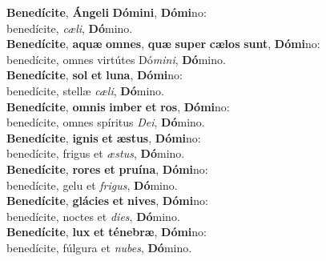\evenverse \textbf{Be}\textbf{ne}\textbf{dí}\textbf{ci}\textbf{te}, \textbf{Án}\textbf{ge}\textbf{li} \textbf{Dó}\textbf{mi}\textbf{ni}, \textbf{Dó}\textbf{mi}no:~\*\\
\evenverse benedícite, \textit{cæ}\textit{li}, \textbf{Dó}mino.\\
\oddverse \textbf{Be}\textbf{ne}\textbf{dí}\textbf{ci}\textbf{te}, \textbf{a}\textbf{quæ} \textbf{om}\textbf{nes}, \textbf{quæ} \textbf{su}\textbf{per} \textbf{cæ}\textbf{los} \textbf{sunt}, \textbf{Dó}\textbf{mi}no:~\*\\
\oddverse benedícite, omnes virtútes Dó\textit{mi}\textit{ni}, \textbf{Dó}mino.\\
\evenverse \textbf{Be}\textbf{ne}\textbf{dí}\textbf{ci}\textbf{te}, \textbf{sol} \textbf{et} \textbf{lu}\textbf{na}, \textbf{Dó}\textbf{mi}no:~\*\\
\evenverse benedícite, stellæ \textit{cæ}\textit{li}, \textbf{Dó}mino.\\
\oddverse \textbf{Be}\textbf{ne}\textbf{dí}\textbf{ci}\textbf{te}, \textbf{om}\textbf{nis} \textbf{im}\textbf{ber} \textbf{et} \textbf{ros}, \textbf{Dó}\textbf{mi}no:~\*\\
\oddverse benedícite, omnes spíritus \textit{De}\textit{i}, \textbf{Dó}mino.\\
\evenverse \textbf{Be}\textbf{ne}\textbf{dí}\textbf{ci}\textbf{te}, \textbf{i}\textbf{gnis} \textbf{et} \textbf{æ}\textbf{stus}, \textbf{Dó}\textbf{mi}no:~\*\\
\evenverse benedícite, frigus et \textit{æ}\textit{stus}, \textbf{Dó}mino.\\
\oddverse \textbf{Be}\textbf{ne}\textbf{dí}\textbf{ci}\textbf{te}, \textbf{ro}\textbf{res} \textbf{et} \textbf{pru}\textbf{í}\textbf{na}, \textbf{Dó}\textbf{mi}no:~\*\\
\oddverse benedícite, gelu et \textit{fri}\textit{gus}, \textbf{Dó}mino.\\
\evenverse \textbf{Be}\textbf{ne}\textbf{dí}\textbf{ci}\textbf{te}, \textbf{glá}\textbf{ci}\textbf{es} \textbf{et} \textbf{ni}\textbf{ves}, \textbf{Dó}\textbf{mi}no:~\*\\
\evenverse benedícite, noctes et \textit{di}\textit{es}, \textbf{Dó}mino.\\
\oddverse \textbf{Be}\textbf{ne}\textbf{dí}\textbf{ci}\textbf{te}, \textbf{lux} \textbf{et} \textbf{té}\textbf{ne}\textbf{bræ}, \textbf{Dó}\textbf{mi}no:~\*\\
\oddverse benedícite, fúlgura et \textit{nu}\textit{bes}, \textbf{Dó}mino.\\
